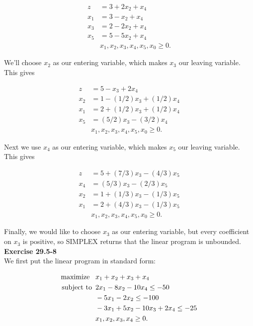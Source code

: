 \documentclass{article}
\begin{document}
\begin{align*}
z &= 3 + 2x_2 + x_4\\
x_1 &= 3 - x_2 + x_4 \\
x_3 &= 2 - 2x_2 + x_4 \\
x_5 &= 5 - 5x_2 + x_4\\
& x_1,x_2,x_3,x_4,x_5,x_0 \geq 0.
\end{align*}

We'll choose $x_2$ as our entering variable, which makes $x_3$ our leaving variable.  This gives

\begin{align*}
z &= 5 - x_3 + 2x_4\\
x_2 &= 1 - (1/2)x_3 + (1/2)x_4 \\
x_1 &= 2 + (1/2)x_3 + (1/2)x_4 \\
x_5 &= (5/2)x_3 - (3/2)x_4\\
& x_1,x_2,x_3,x_4,x_5,x_0 \geq 0.
\end{align*}

Next we use $x_4$ as our entering variable, which makes $x_5$ our leaving variable. This gives

\begin{align*}
z &= 5 + (7/3)x_3 - (4/3)x_5\\
x_4 &= (5/3)x_3 - (2/3)x_5 \\
x_2 &= 1 + (1/3)x_3 - (1/3)x_5 \\
x_1 &= 2 + (4/3)x_3 - (1/3)x_5\\
& x_1,x_2,x_3,x_4,x_5,x_0 \geq 0.
\end{align*}

Finally, we would like to choose $x_3$ as our entering variable, but every coefficient on $x_3$ is positive, so SIMPLEX returns that the linear program is unbounded. \\

\noindent\textbf{Exercise 29.5-8}\\

We first put the linear program in standard form:

\begin{align*}
\mbox{maximize \,\,\,} & x_1 + x_2 + x_3 + x_4 \\
\mbox{subject to \,} & 2x_1 - 8x_2 - 10x_4 \leq -50 \\
& -5x_1 - 2x_2 \leq -100 \\
& -3x_1 + 5x_2 - 10x_3 + 2x_4 \leq -25\\
& x_1,x_2,x_3,x_4 \geq 0.
\end{align*}
\end{document}
